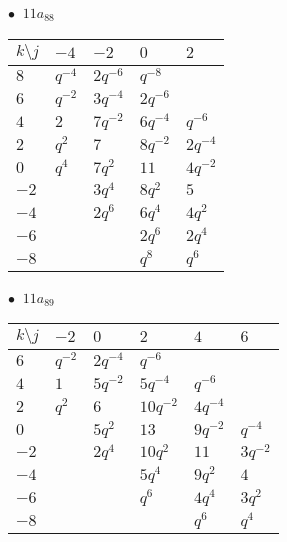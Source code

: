 \begin{minipage}{\linewidth}
$\bullet\ $ $11a_{88}$ \vspace{0.5em} \\
\begin{tabular}{l|llll}
$k \setminus j$ & $-4$ & $-2$ & $0$ & $2$ \\
\hline
$8$ & $q^{-4}$ & $2q^{-6}$ & $q^{-8}$ &  \\
$6$ & $q^{-2}$ & $3q^{-4}$ & $2q^{-6}$ &  \\
$4$ & $2$ & $7q^{-2}$ & $6q^{-4}$ & $q^{-6}$ \\
$2$ & $q^{2}$ & $7$ & $8q^{-2}$ & $2q^{-4}$ \\
$0$ & $q^{4}$ & $7q^{2}$ & $11$ & $4q^{-2}$ \\
$-2$ &  & $3q^{4}$ & $8q^{2}$ & $5$ \\
$-4$ &  & $2q^{6}$ & $6q^{4}$ & $4q^{2}$ \\
$-6$ &  &  & $2q^{6}$ & $2q^{4}$ \\
$-8$ &  &  & $q^{8}$ & $q^{6}$ \\
\end{tabular}
\vspace{2em}
\end{minipage}
%
\begin{minipage}{\linewidth}
$\bullet\ $ $11a_{89}$ \vspace{0.5em} \\
\begin{tabular}{l|lllll}
$k \setminus j$ & $-2$ & $0$ & $2$ & $4$ & $6$ \\
\hline
$6$ & $q^{-2}$ & $2q^{-4}$ & $q^{-6}$ &  &  \\
$4$ & $1$ & $5q^{-2}$ & $5q^{-4}$ & $q^{-6}$ &  \\
$2$ & $q^{2}$ & $6$ & $10q^{-2}$ & $4q^{-4}$ &  \\
$0$ &  & $5q^{2}$ & $13$ & $9q^{-2}$ & $q^{-4}$ \\
$-2$ &  & $2q^{4}$ & $10q^{2}$ & $11$ & $3q^{-2}$ \\
$-4$ &  &  & $5q^{4}$ & $9q^{2}$ & $4$ \\
$-6$ &  &  & $q^{6}$ & $4q^{4}$ & $3q^{2}$ \\
$-8$ &  &  &  & $q^{6}$ & $q^{4}$ \\
\end{tabular}
\vspace{2em}
\end{minipage}
%
